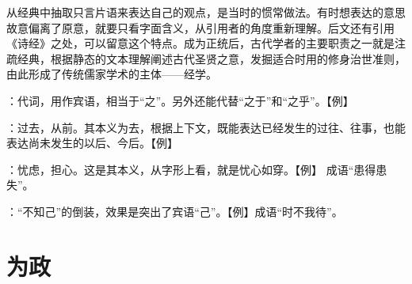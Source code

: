 {\begin{lyitemize}
从经典中抽取只言片语来表达自己的观点，是当时的惯常做法。有时想表达的意思故意偏离了原意，就要只看字面含义，从引用者的角度重新理解。后文还有引用《诗经》之处，可以留意这个特点。成为正统后，古代学者的主要职责之一就是注疏经典，根据静态的文本理解阐述古代圣贤之意，发掘适合时用的修身治世准则，由此形成了传统儒家学术的主体——经学。
\item {}：代词，用作宾语，相当于“之”。另外还能代替“之于”和“之乎”。【例】  
\item {}：过去，从前。其本义为去，根据上下文，既能表达已经发生的过往、往事，也能表达尚未发生的以后、今后。【例】  
\end{lyitemize}
}
{}


{
\item {}：忧虑，担心。这是其本义，从字形上看，就是忧心如穿。【例】 成语“患得患失”。
\item {}：“不知己”的倒装，效果是突出了宾语“己”。【例】成语“时不我待”。
}
{}


\chapter{为政}

